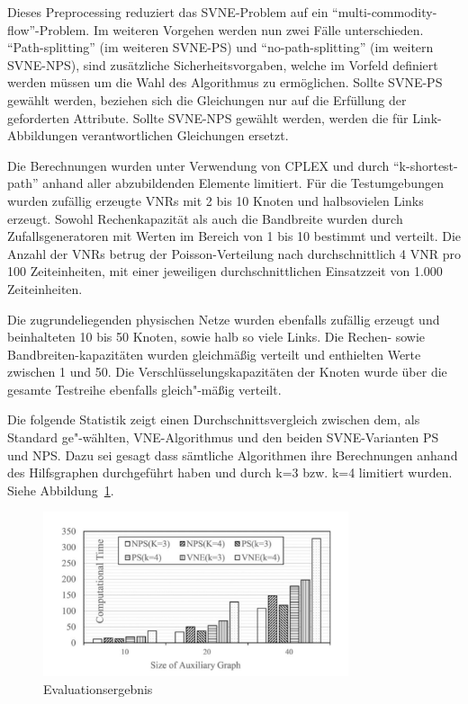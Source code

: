 \documentclass{lni}
\begin{document}
Dieses Preprocessing reduziert das SVNE-Problem auf ein "`multi-commodity-flow"'-Problem. \cite{MCF}
Im weiteren Vorgehen werden nun zwei Fälle unterschieden. "`Path-splitting"' (im weiteren SVNE-PS) und "`no-path-splitting"' (im weitern SVNE-NPS), sind zusätzliche Sicherheitsvorgaben, welche im Vorfeld definiert werden müssen um die Wahl des Algorithmus zu ermöglichen. Sollte SVNE-PS gewählt werden, beziehen sich die Gleichungen nur auf die Erfüllung der geforderten Attribute.
Sollte SVNE-NPS gewählt werden, werden die für Link-Abbildungen verantwortlichen Gleichungen ersetzt.\newline

Die Berechnungen wurden unter Verwendung von CPLEX und durch "`k-shortest-path"' anhand aller abzubildenden Elemente limitiert. \cite{CPLEX}
Für die Testumgebungen wurden zufällig erzeugte VNRs mit 2 bis 10 Knoten und halbsovielen Links erzeugt. Sowohl Rechenkapazität als auch die  Bandbreite wurden durch Zufallsgeneratoren mit Werten im Bereich von 1 bis 10 bestimmt und verteilt. Die Anzahl der VNRs betrug der Poisson-Verteilung nach durchschnittlich 4 VNR pro 100 Zeiteinheiten, mit einer jeweiligen durchschnittlichen Einsatzzeit von 1.000 Zeiteinheiten.

Die zugrundeliegenden physischen Netze wurden ebenfalls zufällig erzeugt und beinhalteten 10 bis 50 Knoten, sowie halb so viele Links. Die Rechen- sowie Bandbreiten-kapazitäten wurden gleichmäßig verteilt und enthielten Werte zwischen 1 und 50. Die Verschlüsselungskapazitäten der Knoten  wurde über die gesamte Testreihe ebenfalls gleich"-mäßig verteilt.

Die folgende Statistik zeigt einen Durchschnittsvergleich zwischen dem, als Standard ge"-wählten, VNE-Algorithmus und den beiden SVNE-Varianten PS und NPS. \cite{Std} Dazu sei gesagt dass sämtliche Algorithmen ihre Berechnungen anhand des Hilfsgraphen durchgeführt haben und durch k=3 bzw. k=4 limitiert wurden. Siehe Abbildung~\ref{graph10}. \newline

\begin{figure}[htb]
\begin{center}
	\includegraphics[width=0.8\textwidth]{statistic.pdf}\newline
	\caption{\label{graph10} Evaluationsergebnis \cite{wang2016towards}}
\end{center}
\end{figure}
\end{document}
